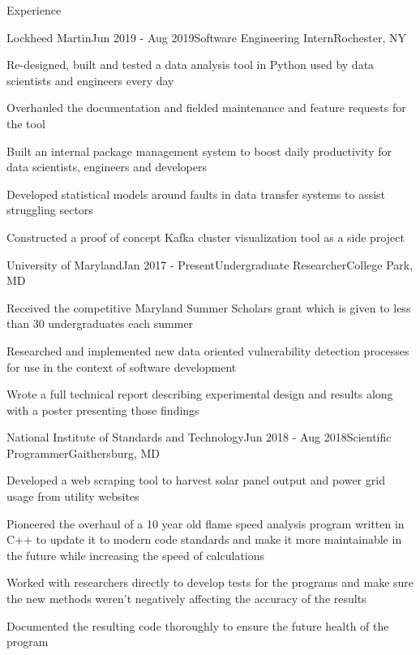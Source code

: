 \documentclass{resume} %
\begin{document}
\begin{rSection}{Experience}


\begin{rSubsection}{Lockheed Martin}{Jun 2019 - Aug 2019}{Software Engineering Intern}{Rochester, NY}
\item Re-designed, built and tested a data analysis tool in Python used by data scientists and engineers every day
\item Overhauled the documentation and fielded maintenance and feature requests for the tool
\item Built an internal package management system to boost daily productivity for data scientists, engineers and developers
\item Developed statistical models around faults in data transfer systems to assist struggling sectors
\item Constructed a proof of concept Kafka cluster visualization tool as a side project
\end{rSubsection}


\begin{rSubsection}{University of Maryland}{Jan 2017 - Present}{Undergraduate Researcher}{College Park, MD}
\item Received the competitive Maryland Summer Scholars grant which is given to less than 30 undergraduates each summer
\item Researched and implemented new data oriented vulnerability detection processes for use in the context of software development
\item Wrote a full technical report describing experimental design and results along with a poster presenting those findings
\end{rSubsection}


\begin{rSubsection}{National Institute of Standards and Technology}{Jun 2018 - Aug 2018}{Scientific Programmer}{Gaithersburg, MD}
\item Developed a web scraping tool to harvest solar panel output and power grid usage from utility websites
\item Pioneered the overhaul of a 10 year old flame speed analysis program written in C++ to update it to modern code standards and make it more maintainable in the future while increasing the speed of calculations
\item Worked with researchers directly to develop tests for the programs and make sure the new methods weren't negatively affecting the accuracy of the results
\item Documented the resulting code thoroughly to ensure the future health of the program
\end{rSubsection}


\end{rSection}
\end{document}

